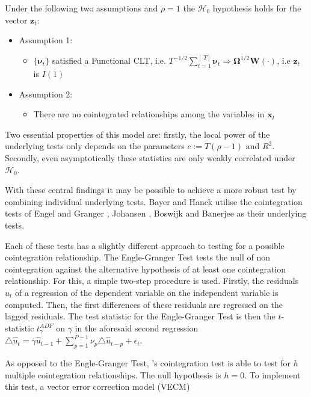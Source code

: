 \documentclass[11pt,a4paper]{article}
\begin{document}
Under the following two assumptions and \(\rho = 1\) the
\(\mathcal{H}_0\) hypothesis holds for the vector \(\pmb{z}_t\):

\begin{itemize}
  \item[] Assumption 1: 
  \begin{itemize}
    \item[] $\{ \pmb{\nu}_t \}$ satisfied a Functional CLT, i.e. $\displaystyle T^{-1/2} \sum_{t = 1}^{[\cdot T]} \pmb{\nu}_t \Rightarrow \pmb{\Omega}^{1/2} \pmb{W}(\cdot)$, i.e $\pmb{z}_t$ is $I(1)$  
  \end{itemize}
  \item[] Assumption 2:
  \begin{itemize}
    \item[] There are no cointegrated relationships among the variables in $\pmb{x}_t$
  \end{itemize}
\end{itemize}

Two essential properties of this model are: firstly, the local power of
the underlying tests only depends on the parameters \(c := T(\rho -1)\)
and \(R^2\). Secondly, even asymptotically these statistics are only
weakly correlated under \(\mathcal{H}_0\). \autocite{gregory_mixed_2004}

With these central findings it may be possible to achieve a more robust
test by combining individual underlying tests. Bayer and Hanck utilise
the cointegration tests of Engel and Granger
\autocite{Englegranger1987}, Johansen \autocite{Johansen1988}, Boswijk
\autocite{Boswijk1994} and Banerjee \autocite{Banerjee1998} as their
underlying tests.

Each of these tests has a slightly different approach to testing for a
possible cointegration relationship. The Engle-Granger Test tests the
null of non cointegration against the alternative hypothesis of at least
one cointegration relationship. For this, a simple two-step procedure is
used. Firstly, the residuals \(\hat{u}_t\) of a regression of the
dependent variable on the independent variable is computed. Then, the
first differences of these residuals are regressed on the lagged
residuals. The test statistic for the Engle-Granger Test is then the
\(t\)-statistic \(t^{ADF}_\gamma\) on \(\gamma\) in the aforesaid second
regression
\(\triangle \hat{u}_t = \gamma \hat{u}_{t-1} + \sum_{p = 1}^{P-1}\nu_p \triangle \hat{u}_{t-p} +\epsilon_t\).
\autocite{Englegranger1987}

As opposed to the Engle-Granger Test, \textcite{Johansen1988}'s
cointegration test is able to test for \(h\) multiple cointegration
relationships. The null hypothesis is \(h = 0\). To implement this test,
a vector error correction model (VECM)
\end{document}
